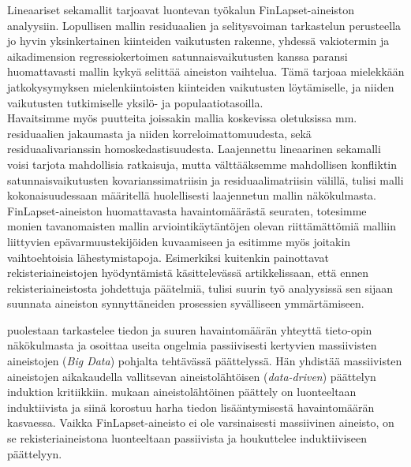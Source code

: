 \documentclass[finnish]{docopts}
\begin{document}
Lineaariset sekamallit tarjoavat luontevan työkalun FinLapset-aineiston analyysiin. Lopullisen mallin residuaalien ja selitysvoiman tarkastelun perusteella jo hyvin yksinkertainen kiinteiden vaikutusten rakenne, yhdessä vakiotermin ja aikadimension regressiokertoimen satunnaisvaikutusten kanssa paransi huomattavasti mallin kykyä selittää aineiston vaihtelua. Tämä tarjoaa mielekkään jatkokysymyksen mielenkiintoisten kiinteiden vaikutusten löytämiselle, ja niiden vaikutusten tutkimiselle yksilö- ja populaatiotasoilla.\\

Havaitsimme myös puutteita joissakin mallia koskevissa oletuksissa mm. residuaalien jakaumasta ja niiden korreloimattomuudesta, sekä residuaalivarianssin homoskedastisuudesta. Laajennettu lineaarinen sekamalli voisi tarjota mahdollisia ratkaisuja, mutta välttääksemme mahdollisen konfliktin satunnaisvaikutusten kovarianssimatriisin ja residuaalimatriisin välillä, tulisi malli kokonaisuudessaan määritellä huolellisesti laajennetun mallin näkökulmasta.\\

FinLapset-aineiston huomattavasta havaintomäärästä seuraten, totesimme monien tavanomaisten mallin arviointikäytäntöjen olevan riittämättömiä malliin liittyvien epävarmuustekijöiden kuvaamiseen ja esitimme myös joitakin vaihtoehtoisia lähestymistapoja. Esimerkiksi \cite{connelly2016} kuitenkin painottavat rekisteriaineistojen hyödyntämistä käsittelevässä artikkelissaan, että ennen rekisteriaineistosta johdettuja päätelmiä, tulisi suurin työ analyysissä sen sijaan suunnata aineiston synnyttäneiden prosessien syvälliseen ymmärtämiseen.\\

\newpage

\cite{fricke14} puolestaan tarkastelee tiedon ja suuren havaintomäärän yhteyttä tieto-opin näkökulmasta ja osoittaa useita ongelmia passiivisesti kertyvien massiivisten aineistojen (\textit{Big Data}) pohjalta tehtävässä päättelyssä. Hän yhdistää massiivisten aineistojen aikakaudella vallitsevan aineistolähtöisen (\textit{data-driven}) päättelyn \cite{popper86} induktion kritiikkiin. \cite{fricke14} mukaan aineistolähtöinen päättely on luonteeltaan induktiivista ja siinä korostuu harha tiedon lisääntymisestä havaintomäärän kasvaessa. Vaikka FinLapset-aineisto ei ole varsinaisesti massiivinen aineisto, on se rekisteriaineistona luonteeltaan passiivista ja houkuttelee induktiiviseen päättelyyn.\\
\end{document}
